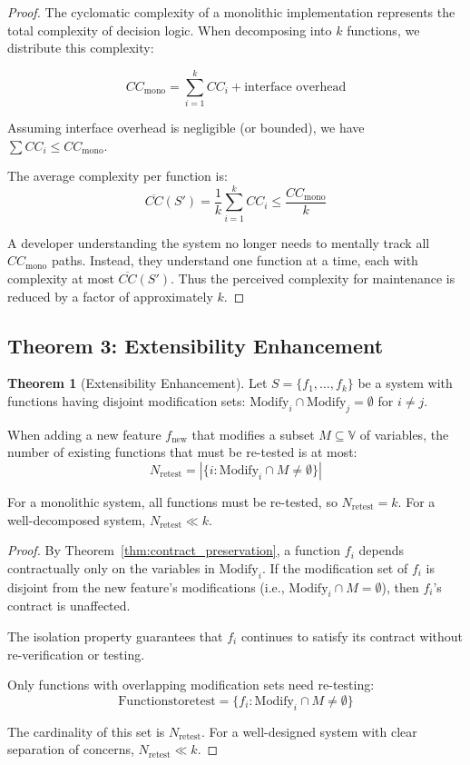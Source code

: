 \documentclass[a4paper,12pt]{article}
\theoremstyle{definition}
\newtheorem{theorem}{Theorem}
\begin{document}
\begin{proof}
The cyclomatic complexity of a monolithic implementation represents the total complexity of decision logic. When decomposing into $k$ functions, we distribute this complexity:

\[
CC_{\mathrm{mono}} = \sum_{i=1}^{k} CC_i + \text{interface overhead}
\]

Assuming interface overhead is negligible (or bounded), we have $\sum CC_i \leq CC_{\mathrm{mono}}$.

The average complexity per function is:
\[
\overline{CC}(S') = \frac{1}{k} \sum_{i=1}^{k} CC_i \leq \frac{CC_{\mathrm{mono}}}{k}
\]

A developer understanding the system no longer needs to mentally track all $CC_{\mathrm{mono}}$ paths. Instead, they understand one function at a time, each with complexity at most $\overline{CC}(S')$. Thus the perceived complexity for maintenance is reduced by a factor of approximately $k$. \qedhere
\end{proof}

\subsection{Theorem 3: Extensibility Enhancement}

\begin{theorem}[Extensibility Enhancement]
\label{thm:extensibility}
Let $S = \{f_1, \ldots, f_k\}$ be a system with functions having disjoint modification sets: $\mathrm{Modify}_i \cap \mathrm{Modify}_j = \emptyset$ for $i \neq j$.

When adding a new feature $f_{\text{new}}$ that modifies a subset $M \subseteq \mathbb{V}$ of variables, the number of existing functions that must be re-tested is at most:
\[
N_{\text{retest}} = |\{i : \mathrm{Modify}_i \cap M \neq \emptyset\}|
\]

For a monolithic system, all functions must be re-tested, so $N_{\text{retest}} = k$. For a well-decomposed system, $N_{\text{retest}} \ll k$.
\end{theorem}

\begin{proof}
By Theorem~\ref{thm:contract_preservation}, a function $f_i$ depends contractually only on the variables in $\mathrm{Modify}_i$. If the modification set of $f_i$ is disjoint from the new feature's modifications (i.e., $\mathrm{Modify}_i \cap M = \emptyset$), then $f_i$'s contract is unaffected.

The isolation property guarantees that $f_i$ continues to satisfy its contract without re-verification or testing.

Only functions with overlapping modification sets need re-testing:
\[
\mathrm{Functions to retest} = \{f_i : \mathrm{Modify}_i \cap M \neq \emptyset\}
\]

The cardinality of this set is $N_{\text{retest}}$. For a well-designed system with clear separation of concerns, $N_{\text{retest}} \ll k$. \qedhere
\end{proof}
\end{document}
